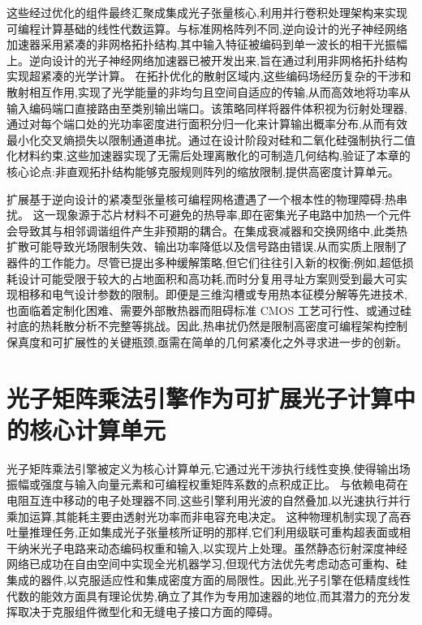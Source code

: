 这些经过优化的组件最终汇聚成集成光子张量核心,利用并行卷积处理架构来实现可编程计算基础的线性代数运算。与标准网格阵列不同,逆向设计的光子神经网络加速器采用紧凑的非网格拓扑结构,其中输入特征被编码到单一波长的相干光振幅上。逆向设计的光子神经网络加速器已被开发出来,旨在通过利用非网格拓扑结构实现超紧凑的光学计算。\citep{doi_10_1038_s41467_026_68648_1_26658a9c} 在拓扑优化的散射区域内,这些编码场经历复杂的干涉和散射相互作用,实现了光学能量的非均匀且空间自适应的传输,从而高效地将功率从输入编码端口直接路由至类别输出端口。该策略同样将器件体积视为衍射处理器,通过对每个端口处的光功率密度进行面积分归一化来计算输出概率分布,从而有效最小化交叉熵损失以限制通道串扰。通过在设计阶段对硅和二氧化硅强制执行二值化材料约束,这些加速器实现了无需后处理离散化的可制造几何结构,验证了本章的核心论点:非直观拓扑结构能够克服规则阵列的缩放限制,提供高密度计算单元。\citep{doi_10_1515_nanoph_2022_0423_38a2c3ec} \citep{doi_10_1038_s41467_026_68648_1_26658a9c}

扩展基于逆向设计的紧凑型张量核可编程网格遭遇了一个根本性的物理障碍:热串扰。\citep{doi_10_1109_access_2020_3013116_8fec1fb2} 这一现象源于芯片材料不可避免的热导率,即在密集光子电路中加热一个元件会导致其与相邻调谐组件产生非预期的耦合。在集成衰减器和交换网络中,此类热扩散可能导致光场限制失效、输出功率降低以及信号路由错误,从而实质上限制了器件的工作能力。尽管已提出多种缓解策略,但它们往往引入新的权衡;例如,超低损耗设计可能受限于较大的占地面积和高功耗,而时分复用寻址方案则受到最大可实现相移和电气设计参数的限制。即便是三维沟槽或专用热本征模分解等先进技术,也面临着定制化困难、需要外部散热器而阻碍标准 CMOS 工艺可行性、或通过硅衬底的热耗散分析不完整等挑战。因此,热串扰仍然是限制高密度可编程架构控制保真度和可扩展性的关键瓶颈,亟需在简单的几何紧凑化之外寻求进一步的创新。\citep{doi_10_1109_access_2020_3013116_8fec1fb2}

\section{光子矩阵乘法引擎作为可扩展光子计算中的核心计算单元}\label{ux5149ux5b50ux77e9ux9635ux4e58ux6cd5ux5f15ux64ceux4f5cux4e3aux53efux6269ux5c55ux5149ux5b50ux8ba1ux7b97ux4e2dux7684ux6838ux5fc3ux8ba1ux7b97ux5355ux5143}

光子矩阵乘法引擎被定义为核心计算单元,它通过光干涉执行线性变换,使得输出场振幅或强度与输入向量元素和可编程权重矩阵系数的点积成正比。\citep{doi_10_1109_hpca57654_2024_00059_f488ee7a} 与依赖电荷在电阻互连中移动的电子处理器不同,这些引擎利用光波的自然叠加,以光速执行并行乘加运算,其能耗主要由透射光功率而非电容充电决定。\citep{doi_10_1109_icop56156_2022_9911729_8d67554d} \citep{doi_10_1145_3716368_3735243_93c8da73} 这种物理机制实现了高吞吐量推理任务,正如集成光子张量核所证明的那样,它们利用级联可重构超表面或相干纳米光子电路来动态编码权重和输入,以实现片上处理。虽然静态衍射深度神经网络已成功在自由空间中实现全光机器学习,但现代方法优先考虑动态可重构、硅集成的器件,以克服适应性和集成密度方面的局限性。因此,光子引擎在低精度线性代数的能效方面具有理论优势,确立了其作为专用加速器的地位,而其潜力的充分发挥取决于克服组件微型化和无缝电子接口方面的障碍。\citep{doi_10_1088_1402_4896_ae8345_3b948559} \citep{doi_10_1515_nanoph_2022_0423_38a2c3ec} \citep{doi_10_3390_nano14080697_c372a140}

